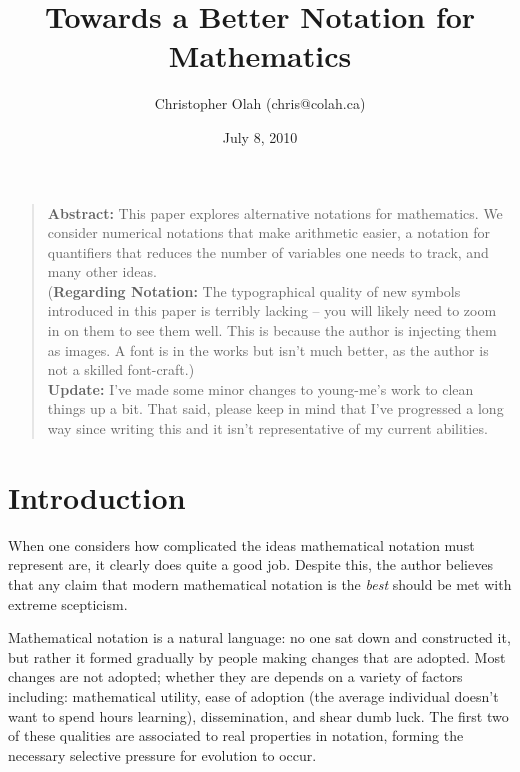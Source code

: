 



\title{Towards a Better Notation for Mathematics}
\author{Christopher Olah (\hbox{chris@colah.ca})}
\date{July 8, 2010}



\maketitle

\begin{quotation}

{\bf Abstract:} This paper explores alternative notations for mathematics. We consider numerical notations that make arithmetic easier, a notation for quantifiers that reduces the number of variables one needs to track, and many other ideas.\\

({\bf Regarding Notation:} The typographical quality of new symbols introduced in this paper is terribly lacking -- you will likely need to zoom in on them to see them well. This is because the author is injecting them as images. A font is in the works but isn't much better, as the author is not a skilled font-craft.)\\

{\bf Update:} I've made some minor changes to young-me's work to clean things up a bit. That said, please keep in mind that I've progressed a long way since writing this and it isn't representative of my current abilities.

\end{quotation}

\tableofcontents
\section{Introduction}

When one considers how complicated the ideas mathematical notation must represent are, it clearly does quite a good job. Despite this, the author believes that any claim that modern mathematical  notation is the \emph{best} should be met with extreme scepticism.
 
% 
Mathematical notation is a natural language: no one sat down and constructed it, but rather it formed gradually by people making changes that are adopted. Most changes are not adopted; whether they are depends on a variety of factors including: mathematical utility, ease of adoption (the average individual doesn't want to spend hours learning), dissemination, and shear dumb luck. The first two of these qualities are associated to real properties in notation, forming the necessary selective pressure for evolution to occur.
 
